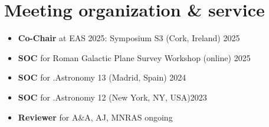 \section*{Meeting organization \& service}

\begin{itemize}
    \item \textbf{Co-Chair} at EAS 2025: Symposium S3 (Cork, Ireland) \hfill 2025
    \item \textbf{SOC} for Roman Galactic Plane Survey Workshop (online) \hfill 2025
    \item \textbf{SOC} for .Astronomy 13 (Madrid, Spain) \hfill 2024
    \item \textbf{SOC} for .Astronomy 12 (New York, NY, USA)\hfill 2023
    \item \textbf{Reviewer} for A\&A, AJ, MNRAS \hfill ongoing
\end{itemize}